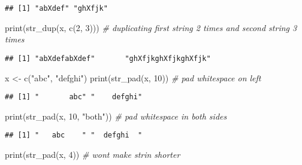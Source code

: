 \documentclass[
]{article}
\newenvironment{Shaded}{\begin{snugshade}}{\end{snugshade}}
\newcommand{\CommentTok}[1]{\textcolor[rgb]{0.56,0.35,0.01}{\textit{#1}}}
\newcommand{\DecValTok}[1]{\textcolor[rgb]{0.00,0.00,0.81}{#1}}
\newcommand{\FunctionTok}[1]{\textcolor[rgb]{0.00,0.00,0.00}{#1}}
\newcommand{\NormalTok}[1]{#1}
\newcommand{\OtherTok}[1]{\textcolor[rgb]{0.56,0.35,0.01}{#1}}
\newcommand{\StringTok}[1]{\textcolor[rgb]{0.31,0.60,0.02}{#1}}
\begin{document}
\begin{verbatim}
## [1] "abXdef" "ghXfjk"
\end{verbatim}

\begin{Shaded}
\begin{Highlighting}[]
\FunctionTok{print}\NormalTok{(}\FunctionTok{str\_dup}\NormalTok{(x, }\FunctionTok{c}\NormalTok{(}\DecValTok{2}\NormalTok{, }\DecValTok{3}\NormalTok{))) }\CommentTok{\# duplicating first string 2 times and second string 3 times}
\end{Highlighting}
\end{Shaded}

\begin{verbatim}
## [1] "abXdefabXdef"       "ghXfjkghXfjkghXfjk"
\end{verbatim}

\begin{Shaded}
\begin{Highlighting}[]
\NormalTok{x }\OtherTok{\textless{}{-}} \FunctionTok{c}\NormalTok{(}\StringTok{"abc"}\NormalTok{, }\StringTok{"defghi"}\NormalTok{)}
\FunctionTok{print}\NormalTok{(}\FunctionTok{str\_pad}\NormalTok{(x, }\DecValTok{10}\NormalTok{)) }\CommentTok{\# pad whitespace on left }
\end{Highlighting}
\end{Shaded}

\begin{verbatim}
## [1] "       abc" "    defghi"
\end{verbatim}

\begin{Shaded}
\begin{Highlighting}[]
\FunctionTok{print}\NormalTok{(}\FunctionTok{str\_pad}\NormalTok{(x, }\DecValTok{10}\NormalTok{, }\StringTok{"both"}\NormalTok{)) }\CommentTok{\# pad whitespace in both sides}
\end{Highlighting}
\end{Shaded}

\begin{verbatim}
## [1] "   abc    " "  defghi  "
\end{verbatim}

\begin{Shaded}
\begin{Highlighting}[]
\FunctionTok{print}\NormalTok{(}\FunctionTok{str\_pad}\NormalTok{(x, }\DecValTok{4}\NormalTok{)) }\CommentTok{\# won\textquotesingle{}t make strin shorter}
\end{Highlighting}
\end{Shaded}
\end{document}

